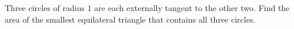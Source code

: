 Three circles of radius $1$ are each externally tangent to the other two. Find the area of the smallest equilateral triangle that contains all three circles.
